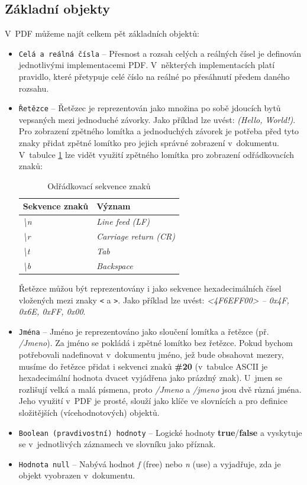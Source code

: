\subsection{Základní objekty}
V~PDF můžeme najít celkem pět základních objektů:
	\begin{itemize}
		\item \verb|Celá a reálná čísla| --  Přesnost a rozsah celých a reálných čísel je definován jednotlivými implementacemi PDF. V~některých implementacích platí pravidlo, které přetypuje celé číslo na reálné po přesáhnutí předem daného rozsahu.
		\item \verb|Řetězce| -- Řetězec je reprezentován jako množina po sobě jdoucích bytů vepsaných mezi jednoduché závorky. Jako příklad lze uvést: \textit{(Hello, World!)}. Pro zobrazení zpětného lomítka a jednoduchých závorek je potřeba před tyto znaky přidat zpětné lomítko pro jejich správné zobrazení v~dokumentu. V~tabulce \ref{tab:table_escaped} lze vidět využití zpětného lomítka pro zobrazení odřádkovacích znaků:
			\begin{table}[h!]
			\centering
			\begin{tabular}{|l|l|} 
			\hline
			\textbf{Sekvence znaků}    & \textbf{Význam}                \\ 
			\hline
			\textit{\textbackslash{}n} & \textit{Line feed (LF)}        \\ 
			\hline
			\textit{\textbackslash{}r} & \textit{Carriage return (CR)}  \\ 
			\hline
			\textit{\textbackslash{}t} & \textit{Tab}                   \\ 
			\hline
			\textit{\textbackslash{}b} & \textit{Backspace}                      \\
			\hline
			\end{tabular}
			\caption{Odřádkovací sekvence znaků}
			\label{tab:table_escaped}
			\end{table}
		\newline Řetězce můžou být reprezentovány i jako sekvence hexadecimálních čísel vložených mezi znaky \verb|<| a \verb|>|. 
		\newline Jako příklad lze uvést: \textit{<4F6EFF00> -- 0x4F, 0x6E, 0xFF, 0x00}.

		\item \verb|Jména| -- Jméno je reprezentováno jako sloučení lomítka a řetězce (př. \textit{/Jmeno}). Za jméno se pokládá i zpětné lomítko bez řetězce. Pokud bychom potřebovali nadefinovat v~dokumentu jméno, jež bude obsahovat mezery, musíme do řetězce přidat i sekvenci znaků \textbf{\#20} (v~tabulce ASCII je hexadecimální hodnota dvacet vyjádřena jako prázdný znak). U~jmen se rozlišují velká a malá písmena, proto \textit{/Jmeno} a \textit{/jmeno} jsou dvě různá jména. Jeho využití v~PDF je prosté, slouží jako klíče ve slovnících a pro definice složitějších (vícehodnotových) objektů.
		\item \verb|Boolean (pravdivostní) hodnoty| -- Logické hodnoty \textbf{true}/\textbf{false} a vyskytuje se v~jednotlivých záznamech ve slovníku jako příznak.
		\item \verb|Hodnota null| -- Nabývá hodnot \textit{f} (free) nebo \textit{n} (use) a vyjadřuje, zda je objekt vyobrazen v~dokumentu.
	\end{itemize}
